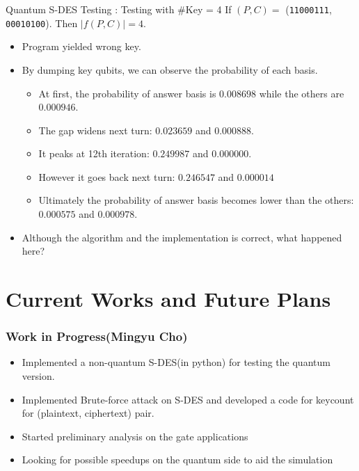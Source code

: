 \documentclass{beamer}
\begin{document}
       
   	\begin{frame}{Quantum S-DES Testing : Testing with \#Key = 4}
        If $ (P, C) =$ (\texttt{11000111}, \texttt{00010100}). Then $ \vert f(P, C) \vert = 4$.
        \begin{itemize}
            \item Program yielded wrong key.
            \item By dumping key qubits, we can observe the probability of each basis.
            \begin{itemize}
                \item At first, the probability of answer basis is $ 0.008698 $ while the others are $ 0.000946 $.
                \item The gap widens next turn: $ 0.023659 $ and $ 0.000888 $.
                \item It peaks at 12th iteration: $ 0.249987 $ and $ 0.000000 $.
                \item However it goes back next turn: $ 0.246547 $ and $ 0.000014 $
                \item Ultimately the probability of answer basis becomes lower than the others: $ 0.000575 $ and $ 0.000978 $.
            \end{itemize}
            \item Although the algorithm and the implementation is correct, what happened here? %
        \end{itemize}
   	\end{frame}
     
    
	\section{Current Works and Future Plans}
	
	\begin{frame}
		\frametitle{Work in Progress(Mingyu Cho)}
		\begin{itemize}
			\item Implemented a non-quantum S-DES(in python) for testing the quantum version.
			\item Implemented Brute-force attack on S-DES and developed a code for keycount for (plaintext, ciphertext) pair.
			\item Started preliminary analysis on the gate applications
			\item Looking for possible speedups on the quantum side to aid the simulation
		\end{itemize}
	\end{frame}
	
\end{document}
